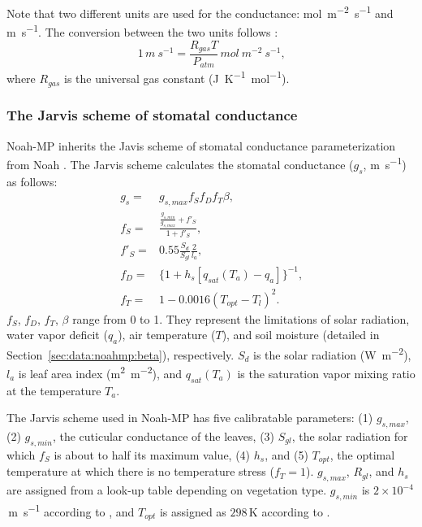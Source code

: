 \documentclass[essd]{copernicus}
\begin{document}
Note that two different units are used for the conductance:
\si{mol~m^{-2}~s^{-1}} and \si{m~s^{-1}}. The conversion between the two units
follows \citet{cowan1978}:
\begin{equation}
  1\,\si{m~s^{-1}} = \frac{R_{gas}T}{P_{atm}} \, \si{mol~m^{-2}~s^{-1}} \text{,}
\end{equation}
where \(R_{gas}\) is the universal gas constant (\si{J~K^{-1}~mol^{-1}}).


\subsubsection{The Jarvis scheme of stomatal conductance}

Noah-MP inherits the Javis scheme \citep{jarvis1976PTRSLBBS} of stomatal
conductance parameterization from Noah \citep{chen2001MWR}. The Jarvis scheme
calculates the stomatal conductance (\(g_s\), \si{m~s^{-1}}) as follows:
\begin{align}
  g_s =    & g_{s,max} f_{S} f_{D} f_{T} \beta \text{,} \\
  f_{S} =  & \frac{\frac{g_{s,min}}{g_{s,max}}+f'_{S}}{1+f'_{S}} \text{,} \\
  f'_{S} = & 0.55 \frac{S_d}{S_{gl}} \frac{2}{l_a} \text{,} \\
  f_{D} =  & \{1+h_s[q_{sat}(T_a)-q_a]\}^{-1} \text{,} \\
  f_{T} =  & 1- 0.0016 (T_{opt} - T_l)^2 \text{.}
\end{align}
\(f_{S}\), \(f_{D}\), \(f_{T}\), \(\beta\) range from 0 to 1. They represent the
limitations of solar radiation, water vapor deficit (\(q_a\)), air temperature
(\(T\)), and soil moisture (detailed in Section~\ref{sec:data:noahmp:beta}),
respectively. \(S_d\) is the solar radiation (\si{W~m^{-2}}), \(l_a\) is leaf
area index (\si{m^2~m^{-2}}), and \(q_{sat}(T_a)\) is the saturation vapor
mixing ratio at the temperature \(T_a\).

The Jarvis scheme used in Noah-MP has five calibratable parameters: (1)
\(g_{s,max}\), (2) \(g_{s,min}\), the cuticular conductance of the leaves, (3)
\(S_{gl}\), the solar radiation for which \(f_{S}\) is about to half its maximum
value, (4) \(h_s\), and (5) \(T_{opt}\), the optimal temperature at which there
is no temperature stress (\(f_{T}=1\)). \(g_{s,max}\), \(R_{gl}\), and \(h_s\)
are assigned from a look-up table depending on vegetation type. \(g_{s,min}\) is
\(2\times10^{-4}\)\,\si{m~s^{-1}} according to \citet{dickinson1993}, and
\(T_{opt}\) is assigned as \(298\)\,\si{K} according to \citet{noilhan1989MWR}.
\end{document}
